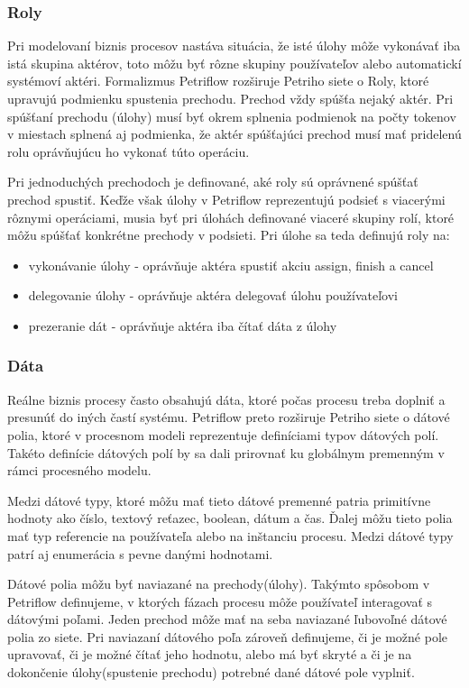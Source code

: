 \subsubsection{Roly}
Pri modelovaní biznis procesov nastáva situácia, že isté úlohy môže vykonávať iba istá skupina aktérov, toto môžu byť rôzne skupiny používateľov alebo automatickí systémoví aktéri.  Formalizmus Petriflow rozširuje Petriho siete o Roly, ktoré upravujú podmienku spustenia prechodu. Prechod vždy spúšťa nejaký aktér. Pri spúšťaní prechodu (úlohy) musí byť okrem splnenia podmienok na počty tokenov v miestach splnená aj podmienka, že aktér spúšťajúci prechod musí mať pridelenú rolu oprávňujúcu  ho vykonať túto operáciu. 

Pri jednoduchých prechodoch je definované, aké roly sú oprávnené spúšťať prechod spustiť. Keďže však úlohy v Petriflow reprezentujú podsieť s viacerými rôznymi operáciami, musia byť pri úlohách definované viaceré skupiny rolí, ktoré môžu spúšťať konkrétne prechody v podsieti. Pri úlohe sa teda definujú roly na:
\begin{itemize}
\item vykonávanie úlohy - oprávňuje aktéra spustiť akciu assign, finish a cancel
\item delegovanie úlohy - oprávňuje aktéra delegovať úlohu používateľovi
\item prezeranie dát - oprávňuje aktéra  iba čítať dáta z úlohy
\end{itemize}

\subsubsection{Dáta}
Reálne biznis procesy často obsahujú dáta, ktoré  počas procesu treba doplniť a presunúť do iných častí systému. Petriflow preto rozširuje Petriho siete o dátové polia, ktoré v procesnom modeli reprezentuje definíciami typov dátových polí. Takéto definície dátových polí by sa dali prirovnať ku globálnym premenným v rámci procesného modelu.  

Medzi dátové typy, ktoré môžu  mať tieto dátové premenné patria primitívne hodnoty ako číslo, textový reťazec, boolean, dátum a čas. Ďalej môžu tieto polia mať typ referencie na používateľa alebo na inštanciu procesu. Medzi dátové typy patrí aj enumerácia s pevne danými hodnotami.

Dátové polia môžu byť naviazané na prechody(úlohy). Takýmto spôsobom v Petriflow definujeme, v ktorých fázach procesu môže používateľ interagovať s dátovými poľami. Jeden prechod môže mať na seba naviazané ľubovoľné dátové polia zo siete. Pri naviazaní dátového poľa zároveň definujeme, či je možné pole upravovať, či je možné čítať jeho hodnotu, alebo má byť skryté a či je na dokončenie úlohy(spustenie prechodu) potrebné dané dátové pole vyplniť.  

